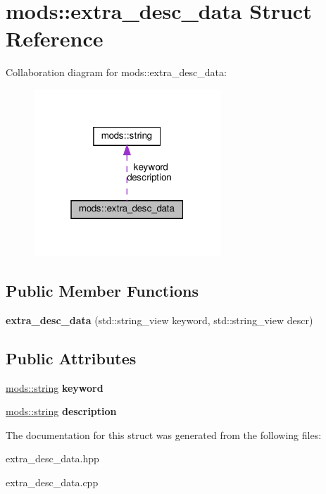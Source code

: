 \hypertarget{structmods_1_1extra__desc__data}{}\section{mods\+:\+:extra\+\_\+desc\+\_\+data Struct Reference}
\label{structmods_1_1extra__desc__data}


Collaboration diagram for mods\+:\+:extra\+\_\+desc\+\_\+data\+:
\nopagebreak
\begin{figure}[H]
\begin{center}
\leavevmode
\includegraphics[width=199pt]{structmods_1_1extra__desc__data__coll__graph}
\end{center}
\end{figure}
\subsection*{Public Member Functions}
\begin{DoxyCompactItemize}
\item 
\mbox{\label{structmods_1_1extra__desc__data_a9ed858e026c2758021493e1a22af94aa}} 
{\bfseries extra\+\_\+desc\+\_\+data} (std\+::string\+\_\+view keyword, std\+::string\+\_\+view descr)
\end{DoxyCompactItemize}
\subsection*{Public Attributes}
\begin{DoxyCompactItemize}
\item 
\mbox{\label{structmods_1_1extra__desc__data_ae50b26f6a46a5025f87c74b0252ef9b1}} 
\hyperlink{structmods_1_1string}{mods\+::string} {\bfseries keyword}
\item 
\mbox{\label{structmods_1_1extra__desc__data_a2f6b66a9508aae2c367b5c7a21c94e06}} 
\hyperlink{structmods_1_1string}{mods\+::string} {\bfseries description}
\end{DoxyCompactItemize}


The documentation for this struct was generated from the following files\+:\begin{DoxyCompactItemize}
\item 
extra\+\_\+desc\+\_\+data.\+hpp\item 
extra\+\_\+desc\+\_\+data.\+cpp\end{DoxyCompactItemize}
